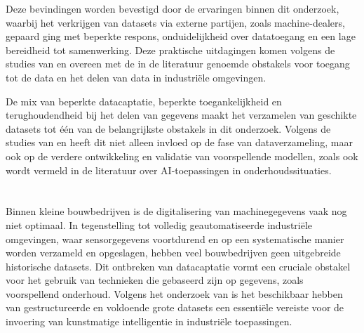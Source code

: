 Deze bevindingen worden bevestigd door de ervaringen binnen dit onderzoek, waarbij het verkrijgen van datasets via externe partijen, zoals machine-dealers, gepaard ging met beperkte respons, onduidelijkheid over datatoegang en een lage bereidheid tot samenwerking. Deze praktische uitdagingen komen volgens de studies van \textcite{Elahi2023} en \textcite{Wang2025} overeen met de in de literatuur genoemde obstakels voor toegang tot de data en het delen van data in industriële omgevingen.

De mix van beperkte datacaptatie, beperkte toegankelijkheid en terughoudendheid bij het delen van gegevens maakt het verzamelen van geschikte datasets tot één van de belangrijkste obstakels in dit onderzoek. Volgens de studies van \textcite{Hu2024} en \textcite{Elahi2023} heeft dit niet alleen invloed op de fase van dataverzameling, maar ook op de verdere ontwikkeling en validatie van voorspellende modellen, zoals ook wordt vermeld in de literatuur over AI-toepassingen in onderhoudssituaties.

\section{}%
\label{sec: De beschikbaarheid van sensorgegevens}


Binnen kleine bouwbedrijven is de digitalisering van machinegegevens vaak nog niet optimaal. In tegenstelling tot volledig geautomatiseerde industriële omgevingen, waar sensorgegevens voortdurend en op een systematische manier worden verzameld en opgeslagen, hebben veel bouwbedrijven geen uitgebreide historische datasets. Dit ontbreken van datacaptatie vormt een cruciale obstakel voor het gebruik van technieken die gebaseerd zijn op gegevens, zoals voorspellend onderhoud. Volgens het onderzoek van \textcite{Elahi2023} is het beschikbaar hebben van gestructureerde en voldoende grote datasets een essentiële vereiste voor de invoering van kunstmatige intelligentie in industriële toepassingen.

